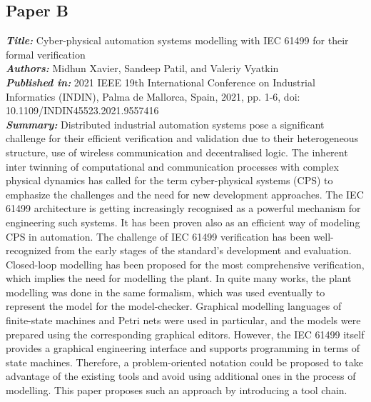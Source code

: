 \subsection{Paper B}
\textbf{\textit{Title:}} Cyber-physical automation systems modelling with IEC 61499 for their formal verification\\
\textbf{\textit{Authors:}} Midhun Xavier, Sandeep Patil, and Valeriy Vyatkin\\
\textbf{\textit{Published in:}} 2021 IEEE 19th International Conference on Industrial Informatics (INDIN), Palma de Mallorca, Spain, 2021, pp. 1-6, doi: 10.1109/INDIN45523.2021.9557416\\
\textbf{\textit{Summary:}} Distributed industrial automation systems pose a significant challenge for their efficient verification and validation due to their heterogeneous structure, use of wireless communication and decentralised logic. The inherent inter twinning of computational and communication processes with complex physical dynamics has called for the term cyber-physical systems (CPS) to emphasize the challenges and the need for new development approaches. The {IEC 61499} architecture is getting increasingly recognised as a powerful mechanism for engineering such systems. It has been proven also as an efficient way of modeling CPS in automation. The challenge of IEC 61499 verification has been well-recognized from the early stages of the standard's development and evaluation. Closed-loop modelling has been proposed for the most comprehensive verification, which implies the need for modelling the plant. In quite many works, the plant modelling was done in the same formalism, which was used eventually to represent the model for the model-checker. Graphical modelling languages of finite-state machines and Petri nets were used in particular, and the models were prepared using the corresponding graphical editors. However, the IEC 61499 itself provides a graphical engineering interface and supports programming in terms of state machines. Therefore, a problem-oriented notation could be proposed to take advantage of the existing tools and avoid using additional ones in the process of modelling. This paper proposes such an approach by introducing a tool chain.\\

